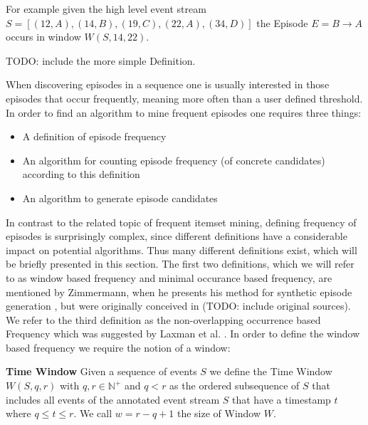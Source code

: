 For example given the high level event stream $S = [ (12,A) , (14,B) , (19,C) , (22,A), (34,D) ]$ the Episode $E = B \rightarrow A$ occurs in window $W(S,14,22)$. \newline \newline 

TODO: include the more simple Definition. \newline \newline

When discovering episodes in a sequence one is usually interested in those episodes that occur frequently, meaning more often than a user defined threshold. In order to find an algorithm to mine frequent episodes one requires three things:

\begin{itemize}
	\item A definition of episode frequency
	\item An algorithm for counting episode frequency (of concrete candidates) according to this definition
	\item An algorithm to generate episode candidates
\end{itemize}

In contrast to the related topic of frequent itemset mining, defining frequency of episodes is surprisingly complex, since different definitions have a considerable impact on potential algorithms. Thus many different definitions exist, which will be briefly presented in this section. The first two definitions, which we will refer to as window based frequency and minimal occurance based frequency, are mentioned by Zimmermann, when he presents his method for synthetic episode generation \cite{zimmermann2012generating}, but were originally conceived in (TODO: include original sources). We refer to the third definition as the non-overlapping occurrence based Frequency which was suggested by Laxman et al. \cite{laxman2007fast}.
In order to define the window based frequency we require the notion of a window:

\begin{mydef}
\textbf{Time Window} Given a sequence of events $S$ we define the Time Window $W(S,q,r)$ with $q,r \in \mathbb{N}^+$ and $q < r$ as the ordered subsequence of $S$ that includes all events of the annotated event stream $S$ that have a timestamp $t$ where $q \leq t\leq r$. We call $w = r-q+1$ the size of Window $W$.
\end{mydef}

